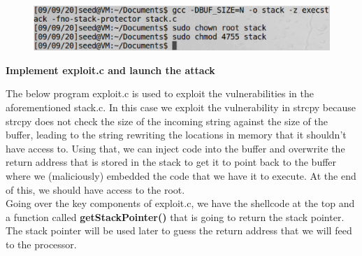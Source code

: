 \documentclass[12pt]{article}
\begin{document}
\begin{figure}[H]
    \centering
    \includegraphics[width=1\textwidth]{bf-stack.png}
\end{figure}



\newpage

\begin{center}
    \textbf{Implement exploit.c and launch the attack}
\end{center}

\noindent
The below program exploit.c is used to exploit the vulnerabilities in the
aforementioned stack.c. In this case we exploit the vulnerability in strcpy because
strcpy does not check the size of the incoming string against the size of the buffer,
leading to the string rewriting the locations in memory that it shouldn't have access
to. Using that, we can inject code into the buffer and overwrite the return address
that is stored in the stack to get it to point back to the buffer where we
(maliciously) embedded the code that we have it to execute. At the end of this,
we should have access to the root.
\\[0.2in]
Going over the key components of exploit.c, we have the shellcode at the top and a
function called \textbf{getStackPointer()} that is going to return the stack pointer.
The stack pointer will be used later to guess the return address that we will feed to
the processor.

\vspace{0.2in}
\end{document}
